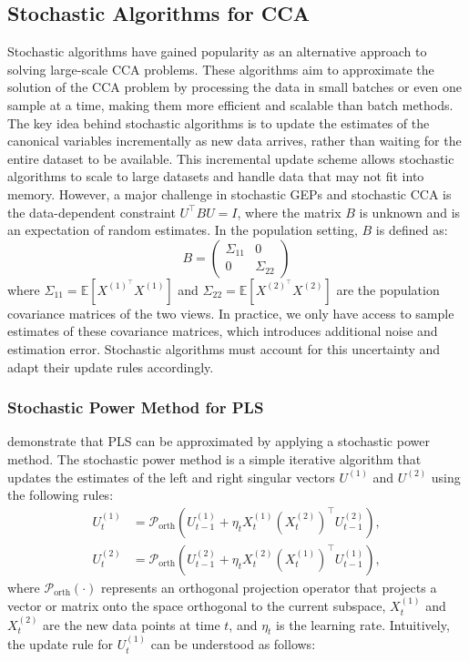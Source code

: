 \subsection{Stochastic Algorithms for CCA}
Stochastic algorithms have gained popularity as an alternative approach to solving large-scale CCA problems. These algorithms aim to approximate the solution of the CCA problem by processing the data in small batches or even one sample at a time, making them more efficient and scalable than batch methods.
The key idea behind stochastic algorithms is to update the estimates of the canonical variables incrementally as new data arrives, rather than waiting for the entire dataset to be available. This incremental update scheme allows stochastic algorithms to scale to large datasets and handle data that may not fit into memory.
However, a major challenge in stochastic GEPs and stochastic CCA is the data-dependent constraint $U^\top B U = I$, where the matrix $B$ is unknown and is an expectation of random estimates. In the population setting, $B$ is defined as:
\begin{equation}
B = \begin{pmatrix}
\Sigma_{11} & 0 \\
0 & \Sigma_{22}
\end{pmatrix}
\end{equation}
where $\Sigma_{11} = \mathbb{E}[X^{(1)^\top} X^{(1)}]$ and $\Sigma_{22} = \mathbb{E}[X^{(2)^\top} X^{(2)}]$ are the population covariance matrices of the two views.
In practice, we only have access to sample estimates of these covariance matrices, which introduces additional noise and estimation error. Stochastic algorithms must account for this uncertainty and adapt their update rules accordingly.

\subsubsection{Stochastic Power Method for PLS}
\citet{arora2016stochastic} demonstrate that PLS can be approximated by applying a stochastic power method. The stochastic power method is a simple iterative algorithm that updates the estimates of the left and right singular vectors $U^{(1)}$ and $U^{(2)}$ using the following rules:
\begin{align*}
U^{(1)}_t &= \mathcal{P}_{\text{orth}} \left( U^{(1)}_{t-1} + \eta_t X_t^{(1)} (X_t^{(2)})^\top U^{(2)}_{t-1} \right), \\
U^{(2)}_t &= \mathcal{P}_{\text{orth}} \left( U^{(2)}_{t-1} + \eta_t X_t^{(2)} (X_t^{(1)})^\top U^{(1)}_{t-1} \right),
\end{align*}
where $\mathcal{P}_{\text{orth}}(\cdot)$ represents an orthogonal projection operator that projects a vector or matrix onto the space orthogonal to the current subspace, $X_t^{(1)}$ and $X_t^{(2)}$ are the new data points at time $t$, and $\eta_t$ is the learning rate.
Intuitively, the update rule for $U^{(1)}_t$ can be understood as follows:

